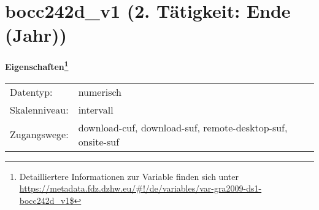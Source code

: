 
    \setcounter{footnote}{0}

    \vspace*{-1.8cm}
	\section{bocc242d\_v1 (2. Tätigkeit: Ende (Jahr))}
	\label{section:bocc242d_v1}



    \vspace*{0.5cm}
    \noindent\textbf{Eigenschaften\footnote{Detailliertere Informationen zur Variable finden sich unter
		\url{https://metadata.fdz.dzhw.eu/\#!/de/variables/var-gra2009-ds1-bocc242d_v1$}}}\\
	\begin{tabularx}{\hsize}{@{}lX}
	Datentyp: & numerisch \\
	Skalenniveau: & intervall \\
	Zugangswege: &
	  download-cuf, 
	  download-suf, 
	  remote-desktop-suf, 
	  onsite-suf
 \\
    \end{tabularx}




